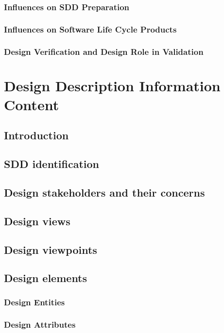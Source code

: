 \documentclass[letterpaper,10pt,titlepage,draftclsnofoot,onecolumn,onesided] {IEEEtran}
\begin{document}
\subsubsection{Influences on SDD Preparation}
\subsubsection{Influences on Software Life Cycle Products}
\subsubsection{Design Verification and Design Role in Validation}

\section{Design Description Information Content}

\subsection{Introduction}

\subsection{SDD identification}

\subsection{Design stakeholders and their concerns}

\subsection{Design views}

\subsection{Design viewpoints}

\subsection{Design elements}
\subsubsection{Design Entities}
\subsubsection{Design Attributes}
\end{document}
